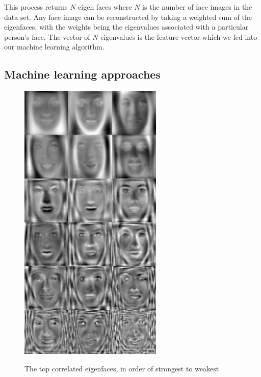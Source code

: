 \documentclass[10pt,twocolumn,letterpaper]{article}
\begin{document}
This process returns $N$ eigen faces where $N$ is the number of face images in the data set. Any face image can be reconstructed by taking a weighted sum of the eigenfaces, with the weights being the eigenvalues associated with a particular person's face. The vector of $N$ eigenvalues is the feature vector which we fed into our machine learning algorithm. 

\subsection{Machine learning approaches}

\begin {figure} [h]
    \centering
        \includegraphics[width = \linewidth]{eigens.png}
    \label{fig:corfaces}
    \caption{The top correlated eigenfaces, in order of strongest to weakest}
\end {figure}
\end{document}
